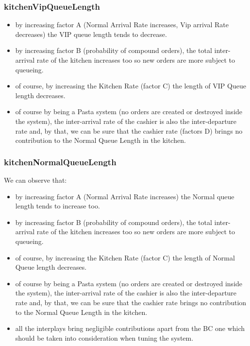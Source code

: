 
\subsubsection{kitchenVipQueueLength}


\begin{itemize}
    \item by increasing factor A (Normal Arrival Rate increases, Vip arrival Rate decreases) the VIP queue length tends to decrease.
    \item by increasing factor B (probability of compound orders), the total inter-arrival rate of the kitchen increases too so new orders are more subject to queueing.
    \item of course, by increasing the Kitchen Rate (factor C) the length of VIP Queue length decreases.
    \item of course by being a Pasta system (no orders are created or destroyed inside the system), the inter-arrival rate of the cashier is also the inter-departure rate and, by that, we can be sure that the cashier rate (factors D) brings no contribution to the Normal Queue Length in the kitchen. %
\end{itemize}

\subsubsection{kitchenNormalQueueLength}


We can observe that:
\begin{itemize}
    \item by increasing factor A (Normal Arrival Rate increases) the Normal queue length tends to increase too.
    \item by increasing factor B (probability of compound orders), the total inter-arrival rate of the kitchen increases too so new orders are more subject to queueing.
    \item of course, by increasing the Kitchen Rate (factor C) the length of Normal Queue length decreases.
    \item of course by being a Pasta system (no orders are created or destroyed inside the system), the inter-arrival rate of the cashier is also the inter-departure rate and, by that, we can be sure that the cashier rate brings no contribution to the Normal Queue Length in the kitchen. %
    \item all the interplays bring negligible contributions apart from the BC one which should be taken into consideration when tuning the system. %
\end{itemize}

